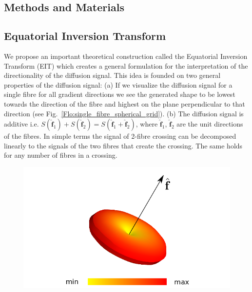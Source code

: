 \documentclass{bioinfo}
\begin{document}
\begin{methods}

\section{Methods and Materials}

\subsection{Equatorial Inversion Transform}

We propose an important theoretical construction called the Equatorial
Inversion Transform (EIT) which creates a general formulation for
the interpretation of the directionality of the diffusion signal.
This idea is founded on two general properties of the diffusion signal:
(a) If we visualize the diffusion signal for a single fibre for all
gradient directions we see the generated shape to be lowest towards
the direction of the fibre and highest on the plane perpendicular
to that direction (see Fig.~\ref{Flo:single_fibre_spherical_grid}).
(b) The diffusion signal is additive i.e. $S(\hat{\mathbf{f}}_{1})+S(\hat{\mathbf{f}}_{2})=S(\hat{\mathbf{f}}_{1}+\hat{\mathbf{f}}_{2})$,
where $\hat{\mathbf{f}}_{1}$, $\hat{\mathbf{f}}_{2}$ are the unit
directions of the fibres. In simple terms the signal of 2-fibre crossing
can be decomposed linearly to the signals of the two fibres that create
the crossing. The same holds for any number of fibres in a crossing.

%
\begin{figure}
\begin{centering}
\includegraphics[scale=0.5]{figures/single_fiber_signal_sphere_grid2}
\par\end{centering}


\end{figure}
\end{methods}
\end{document}
